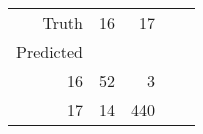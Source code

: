 \begin{tabular}{rrrrr}
\toprule
Truth & 16 & 17 \\
Predicted &  &  \\
\midrule
16 & 52 & 3 \\
17 & 14 & 440 \\
\bottomrule
\end{tabular}
